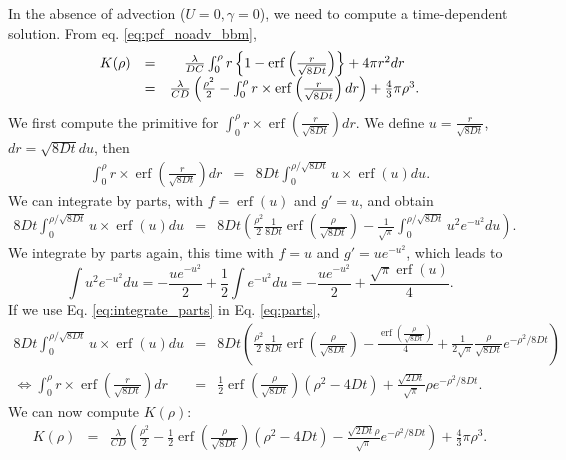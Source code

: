 \documentclass[english]{article}
\DeclareMathOperator\erf{erf}
\begin{document}
In the absence of advection ($U=0,\gamma=0$), we need to compute
a time-dependent solution. From eq. \ref{eq:pcf_noadv_bbm},
\begin{equation}
\protect\begin{array}{ccc}
K(\rho) & = & \frac{\lambda}{DC}\int_{0}^{\rho}r\left\{ 1-\erf\left(\frac{r}{\sqrt{8Dt}}\right)\right\} +4\pi r^{2}dr\protect\\
 & = & \frac{\lambda}{CD}\left(\frac{\rho^{2}}{2}-\int_{0}^{\rho}r\times\erf\left(\frac{r}{\sqrt{8Dt}}\right)dr\right)+\frac{4}{3}\pi\rho^{3}.
\protect\end{array}\label{eq:start_K_intra_no_adv}
\end{equation}
We first compute the primitive for $\int_{0}^{\rho}r\times\erf\left(\frac{r}{\sqrt{8Dt}}\right)dr$.
We define $u=\frac{r}{\sqrt{8Dt}}$, $dr=\sqrt{8Dt}du$, then
\begin{equation}
\begin{array}{ccc}
\int_{0}^{\rho}r\times\erf\left(\frac{r}{\sqrt{8Dt}}\right)dr & = & 8Dt\int_{0}^{\rho/\sqrt{8Dt}}u\times\erf\left(u\right)du.\end{array}
\end{equation}
We can integrate by parts, with $f=\erf(u)$ and $g'=u$, and obtain
\begin{equation}
\begin{array}{ccc}
8Dt\int_{0}^{\rho/\sqrt{8Dt}}u\times\erf\left(u\right)du & = & 8Dt\left(\frac{\rho^{2}}{2}\frac{1}{8Dt}\erf(\frac{\rho}{\sqrt{8Dt}})-\frac{1}{\sqrt{\pi}}\int_{0}^{\rho/\sqrt{8Dt}}u^{2}e^{-u^{2}}du\right).\end{array}\label{eq:parts}
\end{equation}
We integrate by parts again, this time with $f=u$ and $g'=ue^{-u^{2}}$,
which leads to
\begin{equation}
\int u^{2}e^{-u^{2}}du=-\frac{ue^{-u^{2}}}{2}+\frac{1}{2}\int e^{-u^{2}}du=-\frac{ue^{-u^{2}}}{2}+\frac{\sqrt{\pi}\erf(u)}{4}.\label{eq:integrate_parts}
\end{equation}
If we use Eq. \ref{eq:integrate_parts} in Eq. \ref{eq:parts},
\begin{equation}
\begin{array}{ccc}
8Dt\int_{0}^{\rho/\sqrt{8Dt}}u\times\erf\left(u\right)du & = & 8Dt\left(\frac{\rho^{2}}{2}\frac{1}{8Dt}\erf(\frac{\rho}{\sqrt{8Dt}})-\frac{\erf(\frac{\rho}{\sqrt{8Dt}})}{4}+\frac{1}{2\sqrt{\pi}}\frac{\rho}{\sqrt{8Dt}}e^{-\rho^{2}/8Dt}\right)\\
\Leftrightarrow\int_{0}^{\rho}r\times\erf\left(\frac{r}{\sqrt{8Dt}}\right)dr & = & \frac{1}{2}\erf(\frac{\rho}{\sqrt{8Dt}})(\rho^{2}-4Dt)+\frac{\sqrt{2Dt}}{\sqrt{\pi}}\rho e^{-\rho^{2}/8Dt}.
\end{array}
\end{equation}
We can now compute $K(\rho)$:
\begin{equation}
\begin{array}{ccc}
K(\rho) & = & \frac{\lambda}{CD}\left(\frac{\rho^{2}}{2}-\frac{1}{2}\erf(\frac{\rho}{\sqrt{8Dt}})(\rho^{2}-4Dt)-\frac{\sqrt{2Dt}\rho}{\sqrt{\pi}}e^{-\rho^{2}/8Dt}\right)+\frac{4}{3}\pi\rho^{3}.\end{array}\label{eq:end_K}
\end{equation}



\end{document}
